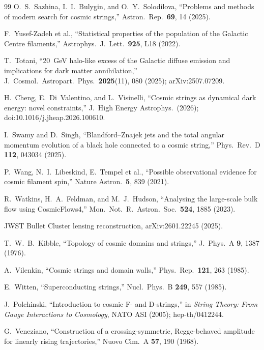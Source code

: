 \documentclass[11pt]{article}
\begin{document}
\begin{thebibliography}{99}
 O.~S.~Sazhina, I.~I.~Bulygin, and O.~Y.~Solodilova, ``Problems and methods of modern search for cosmic strings,'' Astron.\ Rep.\ \textbf{69}, 14 (2025).

 F.~Yusef-Zadeh et al., ``Statistical properties of the population of the Galactic Centre filaments,'' Astrophys.\ J.\ Lett.\ \textbf{925}, L18 (2022).

 T.~Totani, ``20~GeV halo-like excess of the Galactic diffuse emission and implications for dark matter annihilation,'' J.\ Cosmol.\ Astropart.\ Phys.\ \textbf{2025}(11), 080 (2025); arXiv:2507.07209.

 H.~Cheng, E.~Di~Valentino, and L.~Visinelli, ``Cosmic strings as dynamical dark energy: novel constraints,'' J.\ High Energy Astrophys.\ (2026); doi:10.1016/j.jheap.2026.100610.

 I.~Swamy and D.~Singh, ``Blandford--Znajek jets and the total angular momentum evolution of a black hole connected to a cosmic string,'' Phys.\ Rev.\ D \textbf{112}, 043034 (2025).

 P.~Wang, N.~I.~Libeskind, E.~Tempel et al., ``Possible observational evidence for cosmic filament spin,'' Nature Astron.\ \textbf{5}, 839 (2021).

 R.~Watkins, H.~A.~Feldman, and M.~J.~Hudson, ``Analysing the large-scale bulk flow using CosmicFlows4,'' Mon.\ Not.\ R.\ Astron.\ Soc.\ \textbf{524}, 1885 (2023).

 JWST Bullet Cluster lensing reconstruction, arXiv:2601.22245 (2025).

 T.~W.~B.~Kibble, ``Topology of cosmic domains and strings,'' J.\ Phys.\ A \textbf{9}, 1387 (1976).

 A.~Vilenkin, ``Cosmic strings and domain walls,'' Phys.\ Rep.\ \textbf{121}, 263 (1985).

 E.~Witten, ``Superconducting strings,'' Nucl.\ Phys.\ B \textbf{249}, 557 (1985).

 J.~Polchinski, ``Introduction to cosmic F- and D-strings,'' in \emph{String Theory: From Gauge Interactions to Cosmology}, NATO ASI (2005); hep-th/0412244.

 G.~Veneziano, ``Construction of a crossing-symmetric, Regge-behaved amplitude for linearly rising trajectories,'' Nuovo Cim.\ A \textbf{57}, 190 (1968).


\end{thebibliography}
\end{document}
